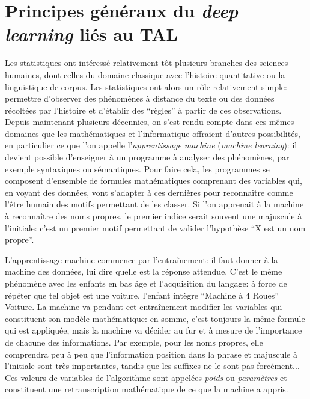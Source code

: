 \chapter{Principes généraux du \textit{deep learning} liés au TAL}

Les statistiques ont intéressé relativement tôt plusieurs branches des sciences humaines, dont celles du domaine classique avec l'histoire quantitative ou la linguistique de corpus. Les statistiques ont alors un rôle relativement simple: permettre d'observer des phénomènes à distance du texte ou des données récoltées par l'histoire et d'établir des \enquote{règles} à partir de ces observations. Depuis maintenant plusieurs décennies, on s'est rendu compte dans ces mêmes domaines que les mathématiques et l'informatique offraient d'autres possibilités, en particulier ce que l'on appelle l'\textit{apprentissage machine} (\textit{machine learning}): il devient possible d'enseigner à un programme à analyser des phénomènes, par exemple syntaxiques ou sémantiques. Pour faire cela, les programmes se composent d'ensemble de formules mathématiques comprenant des variables qui, en voyant des données, vont s'adapter à ces dernières pour reconnaître comme l'être humain des motifs permettant de les classer. Si l'on apprenait à la machine à reconnaître des noms propres, le premier indice serait souvent une majuscule à l'initiale: c'est un premier motif permettant de valider l'hypothèse \enquote{X est un nom propre}.

L'apprentissage machine commence par l'entraînement: il faut donner à la machine des données, lui dire quelle est la réponse attendue. C'est le même phénomène avec les enfants en bas âge et l'acquisition du langage: à force de répéter que tel objet est une voiture, l'enfant intègre \enquote{Machine à 4 Roues} = Voiture. La machine va pendant cet entraînement modifier les variables qui constituent son modèle mathématique: en somme, c'est toujours la même formule qui est appliquée, mais la machine va décider au fur et à mesure de l'importance de chacune des informations. Par exemple, pour les noms propres, elle comprendra peu à peu que l'information position dans la phrase et majuscule à l'initiale sont très importantes, tandis que les suffixes ne le sont pas forcément... Ces valeurs de variables de l'algorithme sont appelées \textit{poids} ou \textit{paramètres} et constituent une retranscription mathématique de ce que la machine a appris. 

